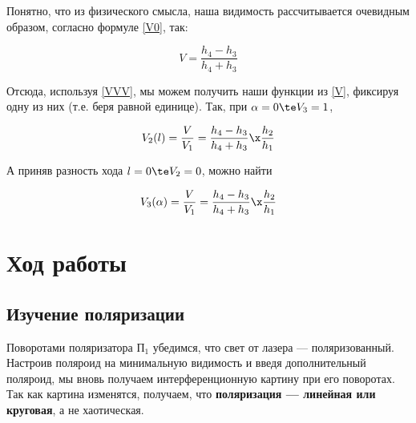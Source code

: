 \documentclass[12pt]{kiarticle}
\begin{document}
Понятно, что из физического смысла, наша видимость рассчитывается очевидным образом, согласно формуле \eqref{V0}, так:

\begin{equation}\label{V}
V = \dfrac{h_4 - h_3}{h_4 + h_3}
\end{equation}

Отсюда, используя \eqref{VVV}, мы можем получить наши функции из \eqref{V}, фиксируя одну из них (т.е. беря равной единице). Так, при $ \alpha = 0 \te V_3 = 1 $, 

\begin{equation}\label{V2}
V_2 (l) = \dfrac{V}{V_1} = \dfrac{h_4 - h_3}{h_4 + h_3} \x \dfrac{h_2}{h_1}
\end{equation}

А приняв разность хода $ l = 0 \te V_2 = 0 $, можно найти 

\begin{equation}\label{V_3}
V_3(\alpha) = \dfrac{V}{V_1} = \dfrac{h_4 - h_3}{h_4 + h_3} \x \dfrac{h_2}{h_1}
\end{equation}

\section{Ход работы}


\subsection{Изучение поляризации}

Поворотами поляризатора $ П_1 $ убедимся, что свет от лазера --- поляризованный. Настроив поляроид на минимальную видимость и введя дополнительный поляроид, мы вновь получаем интерференционную картину при его поворотах. Так как картина изменятся, получаем, что \textbf{поляризация --- линейная или круговая}, а не хаотическая.
\end{document}
